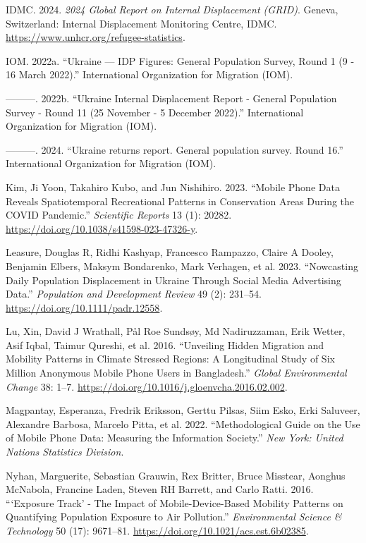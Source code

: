 \documentclass[
  sn-nature,
  11pt,
]{sn-jnl}
\newlength{\cslhangindent}
\newenvironment{CSLReferences}[2] %
 {\begin{list}{}{%
  \setlength{\itemindent}{0pt}
  \setlength{\leftmargin}{0pt}
  \setlength{\parsep}{0pt}
  \ifodd #1
   \setlength{\leftmargin}{\cslhangindent}
   \setlength{\itemindent}{-1\cslhangindent}
  \fi
  \setlength{\itemsep}{#2\baselineskip}}}
 {\end{list}}
\begin{document}
\begin{CSLReferences}{1}{0}
IDMC. 2024. \emph{2024 Global Report on Internal Displacement {(GRID)}}.
Geneva, Switzerland: {Internal Displacement Monitoring Centre, IDMC}.
\url{https://www.unhcr.org/refugee-statistics}.

IOM. 2022a. {``Ukraine --- IDP Figures: General Population Survey, Round
1 (9 - 16 March 2022).''} International Organization for Migration
(IOM).

---------. 2022b. {``Ukraine Internal Displacement Report - General
Population Survey - Round 11 (25 November - 5 December 2022).''}
International Organization for Migration (IOM).

---------. 2024. {``{Ukraine returns report. General population survey.
Round 16}.''} {International Organization for Migration (IOM)}.

Kim, Ji Yoon, Takahiro Kubo, and Jun Nishihiro. 2023. {``Mobile Phone
Data Reveals Spatiotemporal Recreational Patterns in Conservation Areas
During the {COVID} Pandemic.''} \emph{Scientific Reports} 13 (1): 20282.
\url{https://doi.org/10.1038/s41598-023-47326-y}.

Leasure, Douglas R, Ridhi Kashyap, Francesco Rampazzo, Claire A Dooley,
Benjamin Elbers, Maksym Bondarenko, Mark Verhagen, et al. 2023.
{``Nowcasting Daily Population Displacement in {Ukraine} Through Social
Media Advertising Data.''} \emph{Population and Development Review} 49
(2): 231--54. \url{https://doi.org/10.1111/padr.12558}.

Lu, Xin, David J Wrathall, Pål Roe Sundsøy, Md Nadiruzzaman, Erik
Wetter, Asif Iqbal, Taimur Qureshi, et al. 2016. {``Unveiling Hidden
Migration and Mobility Patterns in Climate Stressed Regions: {A}
Longitudinal Study of Six Million Anonymous Mobile Phone Users in
{Bangladesh}.''} \emph{Global Environmental Change} 38: 1--7.
\url{https://doi.org/10.1016/j.gloenvcha.2016.02.002}.

Magpantay, Esperanza, Fredrik Eriksson, Gerttu Pilsas, Siim Esko, Erki
Saluveer, Alexandre Barbosa, Marcelo Pitta, et al. 2022.
{``Methodological Guide on the Use of Mobile Phone Data: Measuring the
Information Society.''} \emph{New York: United Nations Statistics
Division}.

Nyhan, Marguerite, Sebastian Grauwin, Rex Britter, Bruce Misstear,
Aonghus McNabola, Francine Laden, Steven RH Barrett, and Carlo Ratti.
2016. {``{{`Exposure Track'} - The} Impact of Mobile-Device-Based
Mobility Patterns on Quantifying Population Exposure to Air
Pollution.''} \emph{Environmental Science \& Technology} 50 (17):
9671--81. \url{https://doi.org/10.1021/acs.est.6b02385}.


\end{CSLReferences}
\end{document}
